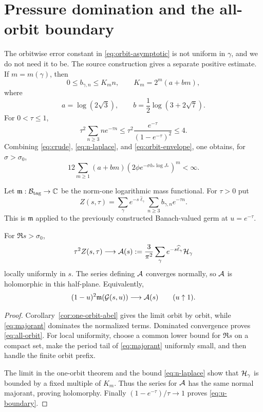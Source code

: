 \section{Pressure domination and the all-orbit boundary}

The orbitwise error constant in \eqref{eq:orbit-asymptotic} is not uniform
in $\gamma$, and we do not need it to be.  The source construction gives a
separate positive estimate.  If $m=m(\gamma)$, then
\begin{equation}
 0\le b_{\gamma,n}\le K_m n,
 \qquad
 K_m=2^m(a+bm),
 \label{eq:crude}
\end{equation}
where
\[
 a=\log(2\sqrt3),
 \qquad b=\frac12\log(3+2\sqrt7).
\]
For $0<\tau\le1$,
\begin{equation}
 \tau^2\sum_{n\ge3}ne^{-\tau n}
 \le\tau^2\frac{e^{-\tau}}{(1-e^{-\tau})^2}\le4.
 \label{eq:n-laplace}
\end{equation}
Combining \eqref{eq:crude}, \eqref{eq:n-laplace}, and
\eqref{eq:orbit-envelope}, one obtains, for $\sigma>\sigma_0$,
\begin{equation}
 12\sum_{m\ge1}(a+bm)
 \left(2\phi e^{-\sigma h_*\log J_*}\right)^m<\infty.
 \label{eq:majorant}
\end{equation}

Let $\mathfrak m:\mathcal B_{\mathrm{tag}}\to\mathbb C$ be the norm-one logarithmic mass
functional.  For $\tau>0$ put
\begin{equation}
 Z(s,\tau)
 =\sum_{\gamma}e^{-s\widehat\ell_\gamma}
 \sum_{n\ge3}b_{\gamma,n}e^{-\tau n}.
 \label{eq:Z}
\end{equation}
This is $\mathfrak m$ applied to the previously constructed Banach-valued
germ at $u=e^{-\tau}$.

\begin{theorem}
For $\Re s>\sigma_0$,
\begin{equation}
 \tau^2Z(s,\tau)\longrightarrow
 \mathcal A(s):=\frac3{\pi^2}
 \sum_{\gamma}e^{-s\widehat\ell_\gamma}\mathcal H_\gamma
 \label{eq:all-orbit}
\end{equation}
locally uniformly in $s$.  The series defining $\mathcal A$ converges normally,
so $\mathcal A$ is holomorphic in this half-plane.  Equivalently,
\begin{equation}
 (1-u)^2\mathfrak m(\mathcal G(s,u))\longrightarrow\mathcal A(s)
 \qquad(u\uparrow1).
 \label{eq:u-boundary}
\end{equation}
\end{theorem}

\begin{proof}
Corollary~\ref{cor:one-orbit-abel} gives the limit orbit by orbit, while
\eqref{eq:majorant} dominates the normalized terms.  Dominated convergence
proves \eqref{eq:all-orbit}.  For local uniformity, choose a common lower
bound for $\Re s$ on a compact set, make the period tail of
\eqref{eq:majorant} uniformly small, and then handle the finite orbit prefix.

The limit in the one-orbit theorem and the bound \eqref{eq:n-laplace} show
that $\mathcal H_\gamma$ is bounded by a fixed multiple of $K_m$.  Thus the
series for $\mathcal A$ has the same normal majorant, proving holomorphy.
Finally $(1-e^{-\tau})/\tau\to1$ proves \eqref{eq:u-boundary}.
\end{proof}

